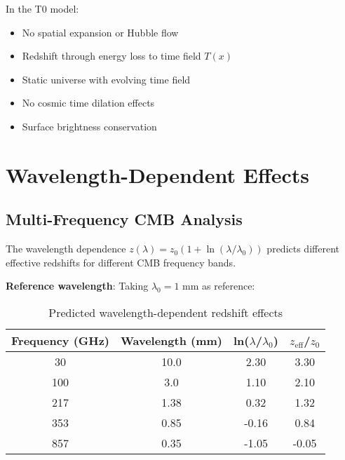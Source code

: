 \documentclass[12pt,a4paper]{article}
\newcommand{\Tfield}{T(x)}
\begin{document}
	\begin{tcolorbox}[colback=blue!5!white,colframe=blue!75!black,title=Fundamental Paradigm Difference]
		In the T0 model:
		\begin{itemize}
			\item No spatial expansion or Hubble flow
			\item Redshift through energy loss to time field $\Tfield$
			\item Static universe with evolving time field
			\item No cosmic time dilation effects
			\item Surface brightness conservation
		\end{itemize}
	\end{tcolorbox}
	
	\section{Wavelength-Dependent Effects}
	\label{sec:wavelength_effects}
	
	\subsection{Multi-Frequency CMB Analysis}
	\label{subsec:multi_frequency}
	
	The wavelength dependence $z(\lambda) = z_0(1 + \ln(\lambda/\lambda_0))$ predicts different effective redshifts for different CMB frequency bands.
	
	\textbf{Reference wavelength}: Taking $\lambda_0 = 1$ mm as reference:
	
	\begin{table}[htbp]
		\centering
		\begin{tabular}{|c|c|c|c|}
			\hline
			\textbf{Frequency (GHz)} & \textbf{Wavelength (mm)} & \textbf{ln($\lambda$/$\lambda_0$)} & \textbf{$z_{\text{eff}}$/$z_0$} \\
			\hline
			30 & 10.0 & 2.30 & 3.30 \\
			100 & 3.0 & 1.10 & 2.10 \\
			217 & 1.38 & 0.32 & 1.32 \\
			353 & 0.85 & -0.16 & 0.84 \\
			857 & 0.35 & -1.05 & -0.05 \\
			\hline
		\end{tabular}
		\caption{Predicted wavelength-dependent redshift effects}
		\label{tab:wavelength_effects}
	\end{table}
	
\end{document}
